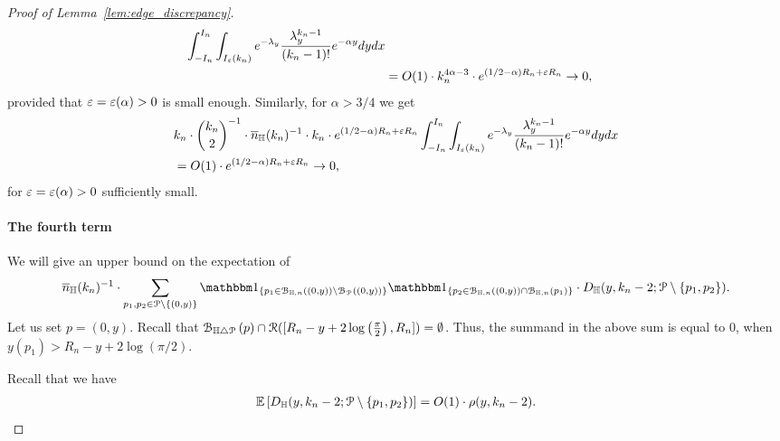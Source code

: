 \begin{proof}[Proof of Lemma~\ref{lem:edge_discrepancy}]
\begin{equation}
\begin{split}
\int_{-I_n}^{I_n} \int_{I_\varepsilon (k_n)} 
e^{-\lambda_y} 
\frac{\lambda_y^{k_n-1}}{(k_n-1)!} e^{-\alpha y} dy dx  \\
&= 
O(1) \cdot k_n^{4\alpha - 3} \cdot e^{(1/2 - \alpha)R_n + \varepsilon R_n} \to 0,
\end{split}
\end{equation}
provided that $\varepsilon = \varepsilon (\alpha)>0$ is small enough. 
Similarly, for $\alpha > 3/4$ we get
\begin{equation} \label{eq:2nd_term-2nd_regime}
\begin{split}
&k_n \cdot {k_n \choose 2}^{-1} \cdot \overline{n}_{\mathbb{H}}(k_n)^{-1} \cdot k_n \cdot 
e^{(1/2 - \alpha)R_n + \varepsilon R_n}
\int_{-I_n}^{I_n} \int_{I_\varepsilon ( k_n )} 
e^{-\lambda_y} 
\frac{\lambda_y^{k_n-1}}{(k_n-1)!} e^{-\alpha y} dy dx  \\
&= O(1)  \cdot e^{(1/2 - \alpha)R_n + \varepsilon R_n} \to 0,
\end{split}
\end{equation}
for $\varepsilon = \varepsilon (\alpha)>0$ sufficiently small.

\paragraph{The fourth term}

We will give an upper bound on the expectation of 
$$\expH^{-1} \cdot \sum_{p_1,p_2\in\Pcal \setminus \{(0,y)\}}\ind{p_1\in \BallHyp{(0,y)} \setminus 
\BallPo{(0,y)}}\ind{p_2 \in \BallHyp{(0,y)}\cap \BallHyp{p_1}} \cdot 
D_\H (y,k_n-2;\Pcal \setminus \{ p_1, p_2\}).$$
Let us set $p=(0,y)$. Recall that ${\mathcal B}_{\mathbb{H} \bigtriangleup {\mathcal P}}\left(p\right)\cap {\mathcal R}([R_n - y + 2 \log\left(\frac{\pi}{2}\right),R_n]) = \emptyset$. Thus, the summand in the above sum is equal to 0, when 
$y(p_1) > R_n - y + 2 \log (\pi/2)$. 

Recall that  we have  
\begin{equation} \label{eq:ball_multitude}
\begin{split}
\mathbb{E}\left[D_{\mathbb{H}} (y,k_n-2;{\mathcal P} \setminus \{ p_1, p_2\})\right]  =O(1)\cdot   \rho(y,k_n-2).
\end{split}
\end{equation}



\end{proof}

